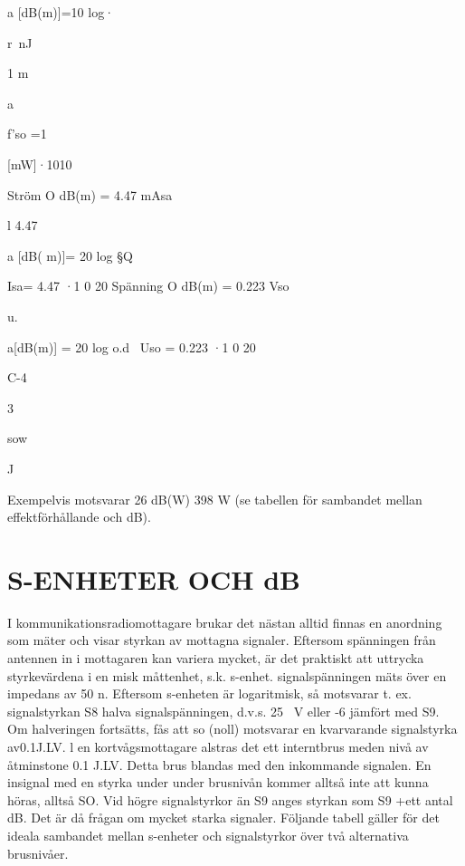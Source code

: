\documentclass[a4paper,twoside,twocolumn,openright]{book}
\begin{document}
{{{{{{{{{{{{{a [dB(m)]=10 log·

r~nJ

1 m

a

f'so =1

[mW]·1010

Ström
O dB(m) = 4.47 mAsa

l
4.47

a [dB( m)]= 20 log §Q

Isa= 4.47 ·1 0 20
Spänning
O dB(m) = 0.223 Vso

u.

a[dB(m)] = 20 log o.d~
Uso = 0.223 ·1 0 20

C-4

3

sow

J

Exempelvis motsvarar 26 dB(W) 398 W
(se tabellen för sambandet mellan effektförhållande och dB).

\chapter{S-ENHETER OCH dB}

I kommunikationsradiomottagare brukar det
nästan alltid finnas en anordning som mäter
och visar styrkan av mottagna signaler.
Eftersom spänningen från antennen in i
mottagaren kan variera mycket, är det praktiskt att uttrycka styrkevärdena i en
misk måttenhet, s.k. s-enhet.
signalspänningen mäts över en impedans av 50 n.
Eftersom s-enheten är logaritmisk, så
motsvarar t. ex. signalstyrkan S8 halva signalspänningen, d.v.s. 25 ~V eller -6
jämfört
med S9. Om halveringen fortsätts, fås att so
(noll) motsvarar en kvarvarande signalstyrka
av0.1J.LV.
l en kortvågsmottagare alstras det ett
interntbrus meden nivå av åtminstone 0.1 J.LV.
Detta brus blandas med den inkommande
signalen. En insignal med en styrka under
under brusnivån kommer alltså inte att kunna
höras, alltså SO. Vid högre signalstyrkor än
S9 anges styrkan som S9 +ett antal dB. Det
är då frågan om mycket starka signaler.
Följande tabell gäller för det ideala sambandet mellan s-enheter och signalstyrkor
över två alternativa brusnivåer.

}}}}}}}}}}}}}
\end{document}
